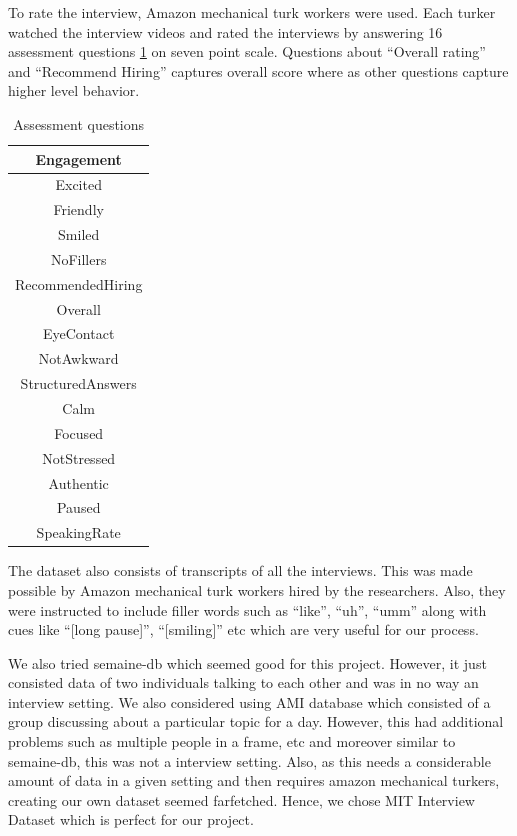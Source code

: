 \documentclass[11pt]{article}
\begin{document}
To rate the interview, Amazon mechanical turk workers were used. Each turker watched the interview videos and rated the interviews by answering 16 assessment questions \ref{tab:assess} on seven point scale. Questions about ``Overall rating'' and ``Recommend Hiring'' captures overall score where as other questions capture higher level behavior. 
\begin{table}[h!]
    \centering
    \begin{tabular}{ | c | }
	\hline
        Engagement \\
	\hline
        Excited \\
        \hline
        Friendly \\
        \hline
        Smiled \\
        \hline
        NoFillers\\
        \hline
        RecommendedHiring \\
        \hline
        Overall \\
        \hline
        EyeContact\\
        \hline
        NotAwkward\\
        \hline
        StructuredAnswers\\
        \hline
        Calm \\
        \hline
        Focused\\
        \hline
        NotStressed\\
        \hline
        Authentic\\
        \hline
        Paused \\
        \hline
        SpeakingRate\\
        \hline
    \end{tabular} 
    \caption{Assessment questions}
    \label{tab:assess}
\end{table}

The dataset also consists of transcripts of all the interviews. This was made possible by Amazon mechanical turk workers hired by the researchers. Also, they were instructed to include filler words such as ``like'', ``uh'', ``umm'' along with cues like ``[long pause]'', ``[smiling]'' etc which are very useful for our process.

We also tried semaine-db \cite{mckeown2012semaine} which seemed good for this project. However, it just consisted data of two individuals talking to each other and was in no way an interview setting. We also considered using AMI database which consisted of a group discussing about a particular topic for a day. However, this had additional problems such as multiple people in a frame, etc and moreover similar to semaine-db, this was not a interview setting. Also, as this needs a considerable amount of data in a given setting and then requires amazon mechanical turkers, creating our own dataset seemed farfetched. Hence, we chose MIT Interview Dataset which is perfect for our project. 
\end{document}
